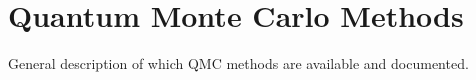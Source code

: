 \chapter{Quantum Monte Carlo Methods}
\label{chap:qmcmethods}

General description of which QMC methods are available and documented.
